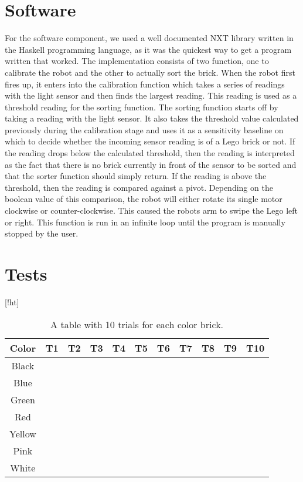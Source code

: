 \documentclass{article}
\begin{document}
\section{Software}
For the software component, we used a well documented NXT library written in the Haskell programming language, as it was the quickest way to get a program written that worked.
The implementation consists of two function, one to calibrate the robot and the other to actually sort the brick.
When the robot first fires up, it enters into the calibration function which takes a series of readings with the light sensor and then finds the largest reading.
This reading is used as a threshold reading for the sorting function.
The sorting function starts off by taking a reading with the light sensor.
It also takes the threshold value calculated previously during the calibration stage and uses it as a sensitivity baseline on which to decide whether the incoming sensor reading is of a Lego brick or not.
If the reading drops below the calculated threshold, then the reading is interpreted as the fact that there is no brick currently in front of the sensor to be sorted and that the sorter function should simply return.
If the reading is above the threshold, then the reading is compared against a pivot.
Depending on the boolean value of this comparison, the robot will either rotate its single motor clockwise or counter-clockwise.
This caused the robots arm to swipe the Lego left or right.
This function is run in an infinite loop until the program is manually stopped by the user.

\section{Tests}[!ht]
\begin{table}
  \begin{center}
    \begin{tabular}{| c | c | c | c | c | c | c | c | c | c | c |}
      \hline 
      Color   & T1 & T2 & T3 & T4 & T5 & T6 & T7 & T8 & T9 & T10 \\
      \hline
      Black   &    &    &    &    &    &    &    &    &    &     \\
      Blue    &    &    &    &    &    &    &    &    &    &     \\
      Green   &    &    &    &    &    &    &    &    &    &     \\
      Red     &    &    &    &    &    &    &    &    &    &     \\
      Yellow  &    &    &    &    &    &    &    &    &    &     \\
      Pink    &    &    &    &    &    &    &    &    &    &     \\
      White   &    &    &    &    &    &    &    &    &    &     \\
      \hline
    \end{tabular}
  \end{center}
  \caption{A table with 10 trials for each color brick.}
\end{table}
\end{document}

